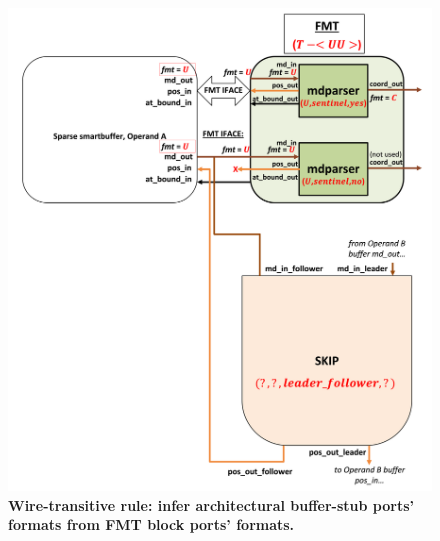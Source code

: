 \begin{figure}[ht]
\includegraphics[width=\textwidth]{figures/safinference_build_07buffportfmt.png}
\caption{\textbf{Wire-transitive rule: infer architectural buffer-stub ports' formats from FMT block ports' formats. }}
\label{fig:safinference_build_07buffportfmt}
\centering
\end{figure}




